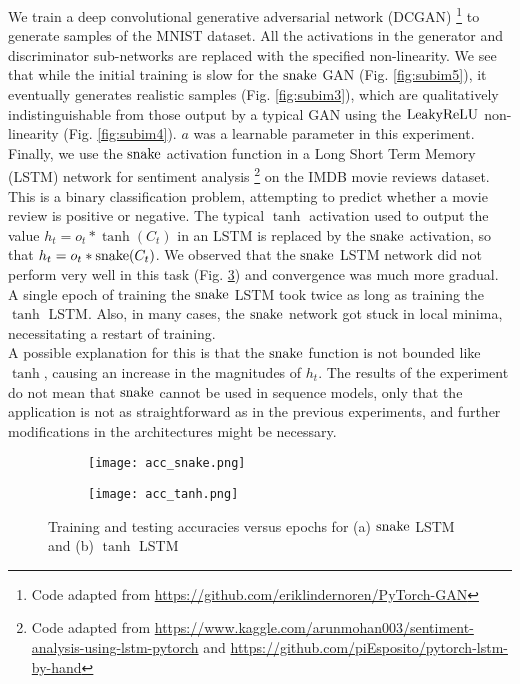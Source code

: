 We train a deep convolutional generative adversarial network (DCGAN) \footnote{Code adapted from \url{https://github.com/eriklindernoren/PyTorch-GAN}} \cite{radford2016unsupervised} to generate samples of the MNIST dataset. All the activations in the generator and discriminator sub-networks are replaced with the specified non-linearity. We see that while the initial training is slow for the $ \operatorname{snake} $ GAN (Fig. \ref{fig:subim5}), it eventually generates realistic samples (Fig. \ref{fig:subim3}), which are qualitatively indistinguishable from those output by a typical GAN using the $ \operatorname{LeakyReLU} $ non-linearity (Fig. \ref{fig:subim4}). $a$ was a learnable parameter in this experiment. \\

Finally, we use the $ \operatorname{snake} $ activation function in a Long Short Term Memory (LSTM) network for sentiment analysis 
\footnote{Code adapted from \url{https://www.kaggle.com/arunmohan003/sentiment-analysis-using-lstm-pytorch} and \url{https://github.com/piEsposito/pytorch-lstm-by-hand}} 
on the IMDB movie reviews dataset. 
This is a binary classification problem, attempting to predict whether a movie review is positive or negative. The typical $ \tanh $ activation used to output the value $ h_{t} = o_{t} * \tanh(C_t) $ in an LSTM is replaced by the $ \operatorname{snake} $ activation, so that $h_{t} = o_{t} * \operatorname{snake}(C_{t})$. 
We observed that the $ \operatorname{snake} $ LSTM network did not perform very well in this task (Fig. \ref{fig:lstm_acc}) and convergence was much more gradual. A single epoch of training the $ \operatorname{snake} $ LSTM took twice as long as training the $ \tanh $ LSTM.  Also, in many cases, the $ \operatorname{snake} $ network got stuck in local minima, necessitating a restart of training. \\

A possible explanation for this is that the $ \operatorname{snake} $ function is not bounded like $ \tanh $, causing an increase in the magnitudes of $ h_{t} $. The results of the experiment do not mean that $ \operatorname{snake} $ cannot be used in sequence models, only that the application is not as straightforward as in the previous experiments, and further modifications in the architectures might be necessary. 

\begin{figure}[h]
  \centering
  \begin{subfigure}{0.45\textwidth}
    \centering
    \texttt{[image: acc\_snake.png]} 
    \caption{}
    \label{fig:subim8}
  \end{subfigure}
  \begin{subfigure}{0.45\textwidth}
    \centering
    \texttt{[image: acc\_tanh.png]}
    \caption{}
    \label{fig:subim9}
  \end{subfigure}
  \caption{Training and testing accuracies versus epochs for (a) $ \operatorname{snake} $ LSTM and (b) $ \tanh $ LSTM}
  \label{fig:lstm_acc}
\end{figure}


